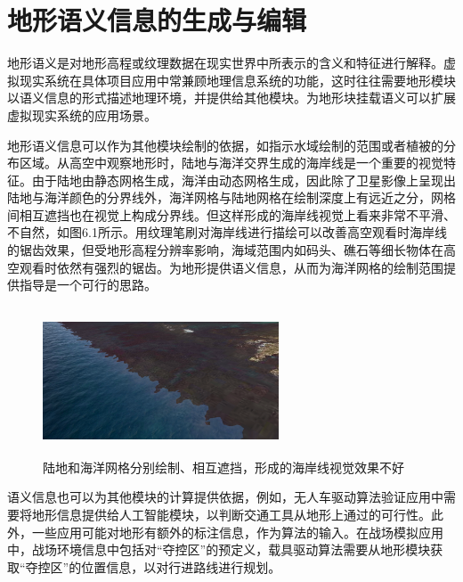 
\chapter{地形语义信息的生成与编辑}
地形语义是对地形高程或纹理数据在现实世界中所表示的含义和特征进行解释。虚拟现实系统在具体项目应用中常兼顾地理信息系统的功能\supercite{沈敬伟}，这时往往需要地形模块以语义信息的形式描述地理环境，并提供给其他模块。为地形块挂载语义可以扩展虚拟现实系统的应用场景。\par
地形语义信息可以作为其他模块绘制的依据，如指示水域绘制的范围或者植被的分布区域。从高空中观察地形时，陆地与海洋交界生成的海岸线是一个重要的视觉特征。由于陆地由静态网格生成，海洋由动态网格生成，因此除了卫星影像上呈现出陆地与海洋颜色的分界线外，海洋网格与陆地网格在绘制深度上有远近之分，网格间相互遮挡也在视觉上构成分界线。但这样形成的海岸线视觉上看来非常不平滑、不自然，如图6.1所示。用纹理笔刷对海岸线进行描绘可以改善高空观看时海岸线的锯齿效果，但受地形高程分辨率影响，海域范围内如码头、礁石等细长物体在高空观看时依然有强烈的锯齿。为地形提供语义信息，从而为海洋网格的绘制范围提供指导是一个可行的思路。\par
\begin{figure}[H]
    \centering
    \includegraphics[height=4.4cm,width=7cm]{figures/shoreBad.png}
    \caption{陆地和海洋网格分别绘制、相互遮挡，形成的海岸线视觉效果不好}
\end{figure}
语义信息也可以为其他模块的计算提供依据，例如，无人车驱动算法验证应用中需要将地形信息提供给人工智能模块，以判断交通工具从地形上通过的可行性。此外，一些应用可能对地形有额外的标注信息，作为算法的输入。在战场模拟应用中，战场环境信息中包括对“夺控区”的预定义，载具驱动算法需要从地形模块获取“夺控区”的位置信息，以对行进路线进行规划。
